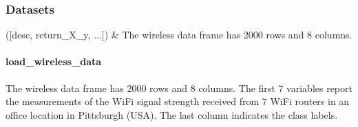\documentclass[letterpaper,10pt,english,openany,oneside]{sphinxmanual}
\begin{document}
{{{{

\subsubsection{Datasets}
\label{\detokenize{api_reference/index:datasets}}\label{\detokenize{api_reference/index:module-QuadratiK.datasets}}

\begin{savenotes}\sphinxattablestart
\sphinxthistablewithglobalstyle
\sphinxthistablewithnovlinesstyle
\centering
\begin{tabulary}{\linewidth}[t]{}
\sphinxtoprule
\sphinxtableatstartofbodyhook
\sphinxAtStartPar
{\hyperref[\detokenize{api_reference/generated/QuadratiK.datasets.load_wireless_data:QuadratiK.datasets.load_wireless_data}]{}}({[}desc, return\_X\_y, ...{]})
&
\sphinxAtStartPar
The wireless data frame has 2000 rows and 8 columns.
\\
\sphinxbottomrule
\end{tabulary}
\sphinxtableafterendhook\par
\sphinxattableend\end{savenotes}

\sphinxstepscope


\paragraph{load\_wireless\_data}
\label{\detokenize{api_reference/generated/QuadratiK.datasets.load_wireless_data:load-wireless-data}}\label{\detokenize{api_reference/generated/QuadratiK.datasets.load_wireless_data::doc}}

\begin{fulllineitems}
\label{\detokenize{api_reference/generated/QuadratiK.datasets.load_wireless_data:QuadratiK.datasets.load_wireless_data}}
\pysigstartsignatures
{}
\pysigstopsignatures
\sphinxAtStartPar
The wireless data frame has 2000 rows and 8 columns. The first 7 variables
report the measurements of the Wi\sphinxhyphen{}Fi signal strength received from 7 Wi\sphinxhyphen{}Fi routers in an
office location in Pittsburgh (USA). The last column indicates the class labels.


\end{fulllineitems}}}}}
\end{document}
